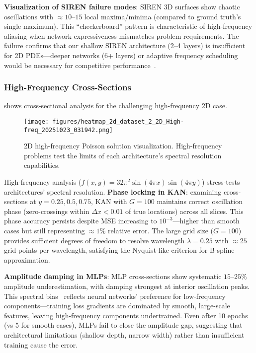 \documentclass[11pt,a4paper]{article}
\begin{document}
\textbf{Visualization of SIREN failure modes}: SIREN 3D surfaces show chaotic oscillations with $\approx 10$--$15$ local maxima/minima (compared to ground truth's single maximum). This ``checkerboard'' pattern is characteristic of high-frequency aliasing when network expressiveness mismatches problem requirements. The failure confirms that our shallow SIREN architecture (2--4 layers) is insufficient for 2D PDEs—deeper networks (6+ layers) or adaptive frequency scheduling would be necessary for competitive performance~\citep{sitzmann2020implicit}.

\subsubsection{High-Frequency Cross-Sections}

 shows cross-sectional analysis for the challenging high-frequency 2D case.

\begin{figure}[htbp]
\centering
\texttt{[image: figures/heatmap\_2d\_dataset\_2\_2D\_High-freq\_20251023\_031942.png]}
\caption{2D high-frequency Poisson solution visualization. High-frequency problems test the limits of each architecture's spectral resolution capabilities.}
\label{fig:s13_cross_highfreq}
\end{figure}

High-frequency analysis ($f(x,y) = 32\pi^2\sin(4\pi x)\sin(4\pi y)$) stress-tests architectures' spectral resolution. \textbf{Phase locking in KAN}: examining cross-sections at $y=0.25, 0.5, 0.75$, KAN with $G=100$ maintains correct oscillation phase (zero-crossings within $\Delta x < 0.01$ of true locations) across all slices. This phase accuracy persists despite MSE increasing to $10^{-3}$—higher than smooth cases but still representing $\approx 1\%$ relative error. The large grid size ($G=100$) provides sufficient degrees of freedom to resolve wavelength $\lambda = 0.25$ with $\approx 25$ grid points per wavelength, satisfying the Nyquist-like criterion for B-spline approximation.

\textbf{Amplitude damping in MLPs}: MLP cross-sections show systematic $15$--$25\%$ amplitude underestimation, with damping strongest at interior oscillation peaks. This spectral bias~\citep{krishnapriyan2021characterizing} reflects neural networks' preference for low-frequency components—training loss gradients are dominated by smooth, large-scale features, leaving high-frequency components undertrained. Even after 10 epochs (vs 5 for smooth cases), MLPs fail to close the amplitude gap, suggesting that architectural limitations (shallow depth, narrow width) rather than insufficient training cause the error.
\end{document}
